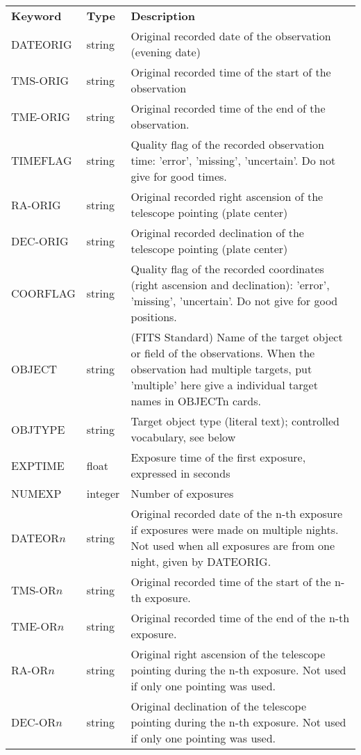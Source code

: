 \documentclass[11pt]{ivoa}
\begin{document}
\begingroup
\footnotesize
\begin{longtable}{llp{}}
\sptablerule
\textbf{Keyword}&
\textbf{Type}&\textbf{Description}\\
\sptablerule
\endhead
DATEORIG  &string  &
  Original recorded date of the observation (evening date)\\
TMS-ORIG  &string  &
  Original recorded time of the start of the observation\\
TME-ORIG  &string  &
  Original recorded time of the end of the observation.\\
TIMEFLAG  &string  &
  Quality flag of the recorded observation time: 'error', 'missing',
  'uncertain'.  Do not give for good times.\\
RA-ORIG   &string  &
  Original recorded right ascension of the telescope pointing (plate center)\\
DEC-ORIG  &string  &
  Original recorded declination of the telescope pointing (plate center)\\
COORFLAG  &string  &
  Quality flag of the recorded coordinates (right ascension and
  declination): 'error', 'missing', 'uncertain'.  Do not give for good
  positions.\\
OBJECT    &string &
  (FITS Standard) Name of the target object or field of the
  observations.  When the observation had multiple targets, put
  'multiple' here give a
  individual target names in OBJECTn cards.\\
OBJTYPE   &string  &
  Target object type (literal text); controlled vocabulary, see below\\
EXPTIME   &float   &
  Exposure time of the first exposure, expressed in seconds\\
NUMEXP    &integer &Number of exposures\\
DATEOR$n$ &string  &
  Original recorded date of the n-th exposure if exposures
  were made on multiple nights. Not used when all exposures are from
  one night, given by DATEORIG.\\
TMS-OR$n$ &string  &
  Original recorded time of the start of the n-th exposure.\\
TME-OR$n$ &string  &
  Original recorded time of the end of the n-th exposure.\\
RA-OR$n$  &string  &
  Original right ascension of the telescope pointing during the n-th
  exposure. Not used if only one pointing was used.\\
DEC-OR$n$ &string   &
  Original declination of the telescope pointing during the n-th
  exposure. Not used if only one pointing was used.\\

\end{longtable}
\end{document}
